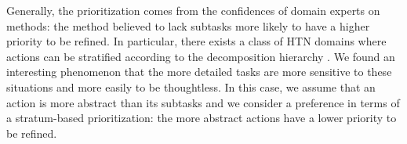 \documentclass[letterpaper]{article} %
\newtheorem{definition}{Definition}
\newcommand{\Operators}{\mathcal{O}}
\newcommand{\Cactions}{\mathcal{C}}
\newcommand{\stratify}{k}
\begin{document}
Generally, the prioritization comes from the confidences of domain experts on methods: the method believed to lack subtasks more likely to have a higher priority to be refined.
In particular, there exists a class of HTN domains where actions can be stratified according to the decomposition hierarchy \cite{erol1996complexity,DBLP:conf/socs/AlfordSKN12}.
We found an interesting phenomenon that the more detailed tasks are more sensitive to these situations and more easily to be thoughtless.
In this case, we assume that an action is more abstract than its subtasks and we consider a preference in terms of a stratum-based prioritization: the more abstract actions have a lower priority to be refined.
%
%
\end{document}
